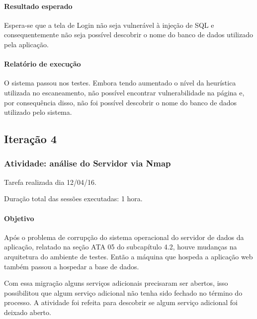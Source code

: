 \documentclass[
    12pt,               %
    openright,          %
    oneside,            %
    a4paper,            %
    section=TITLE,     %
    english,            %
    french,             %
    spanish,            %
    brazil              %
    ]{abntex2}
\begin{document}
\paragraph*{Resultado esperado}

Espera-se que a tela de Login não seja vulnerável à injeção de SQL e consequentemente não seja possível descobrir o nome do banco de dados utilizado pela aplicação.



\paragraph*{Relatório de execução}

O sistema passou nos testes. Embora tendo aumentado o nível da heurística utilizada no escaneamento, não possível encontrar vulnerabilidade na página e, por consequência disso, não foi possível descobrir o nome do banco de dados utilizado pelo sistema.



\subsection{Iteração 4}


\subsubsection*{Atividade: análise do Servidor via Nmap}

Tarefa realizada dia 12/04/16.


Duração total das sessões executadas: 1 hora.



\paragraph*{Objetivo}

Após o problema de corrupção do sistema operacional do servidor de dados da aplicação, relatado na seção ATA 05 do subcapítulo 4.2, houve mudanças na arquitetura do ambiente de testes. Então a máquina que hospeda a aplicação web também passou a hospedar a base de dados.


Com essa migração alguns serviços adicionais precisaram ser abertos, isso possibilitou que algum serviço adicional não tenha sido fechado no término do processo. A atividade foi refeita para descobrir se algum serviço adicional foi deixado aberto.
\end{document}
